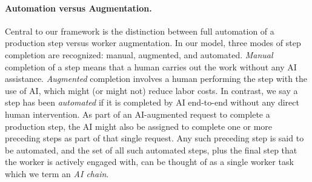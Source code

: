 \paragraph{Automation versus Augmentation.}
Central to our framework is the distinction between full automation of a production step versus worker augmentation.
In our model, three modes of step completion are recognized: manual, augmented, and automated.
\emph{Manual} completion of a step means that a human carries out the work without any AI assistance.
\emph{Augmented} completion involves a human performing the step with the use of AI, which might (or might not) reduce labor costs.
In contrast, we say a step has been \emph{automated} if it is completed by AI end-to-end without any direct human intervention.
As part of an AI-augmented request to complete a production step, the AI might also be assigned to complete one or more preceding steps as part of that single request.
Any such preceding step is said to be automated, and the set of all such automated steps, plus the final step that the worker is actively engaged with, can be thought of as a single worker task which we term an \emph{AI chain}.


